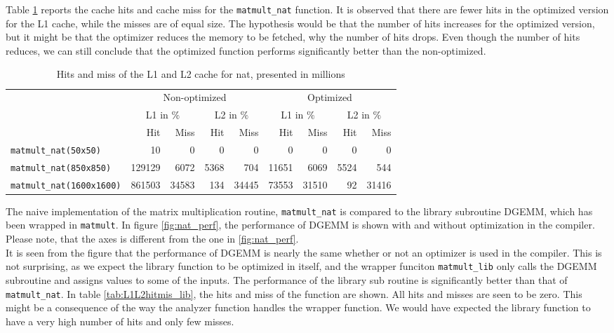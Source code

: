 Table \ref{tab:L1L2hitmis_nat} reports the cache hits and cache miss for the \texttt{matmult\_nat} function. It is observed that there are fewer hits in the optimized version for the L1 cache, while the misses are of equal size. The hypothesis would be that the number of hits increases for the optimized version, but it might be that the optimizer reduces the memory to be fetched, why the number of hits drops. Even though the number of hits reduces, we can still conclude that the optimized function performs significantly better than the non-optimized.

\begin{table}[!th]
\centering
\begin{tabular}{l|rr|rr|rr|rr}
\multirow{3}{*}{} & \multicolumn{4}{|c}{Non-optimized}& \multicolumn{4}{|c}{Optimized}\\
& \multicolumn{2}{|c}{L1 in $\%$} & \multicolumn{2}{|c}{L2 in $\%$}& \multicolumn{2}{|c}{L1 in $\%$} & \multicolumn{2}{|c}{L2 in $\%$} \\
& Hit& Miss& Hit& Miss& Hit& Miss& Hit& Miss\\ \hline
\texttt{matmult\_nat(50x50)}& 10 & 0 & 0 & 0 &0 & 0 & 0 & 0\\
\texttt{matmult\_nat(850x850)} & 129129 & 6072 & 5368 & 704 & 11651 & 6069 & 5524 & 544\\
\texttt{matmult\_nat(1600x1600)}& 861503 & 34583 & 134 & 34445& 73553 & 31510 & 92 & 31416\\
\end{tabular}
\caption{Hits and miss of the L1 and L2 cache for nat, presented in millions}
\label{tab:L1L2hitmis_nat}
\end{table}
\newpage

The naive implementation of the matrix multiplication routine, \texttt{matmult\_nat} is compared to the library subroutine DGEMM, which has been wrapped in \texttt{matmult\lib}. In figure \ref{fig:nat_perf}, the performance of DGEMM is shown with and without optimization in the compiler. Please note, that the axes is different from the one in \ref{fig:nat_perf}.\\
It is seen from the figure that the performance of DGEMM is nearly the same whether or not an optimizer is used in the compiler. This is not surprising, as we expect the library function to be optimized in itself, and the wrapper funciton \texttt{matmult\_lib} only calls the DGEMM subroutine and assigns values to some of the inputs. The performance of the library sub routine is significantly better than that of \texttt{matmult\_nat}. In table \ref{tab:L1L2hitmis_lib}, the hits and miss of the function are shown. All hits and misses are seen to be zero. This might be a consequence of the way the analyzer function handles the wrapper function. We would have expected the library function to have a very high number of hits and only few misses.

